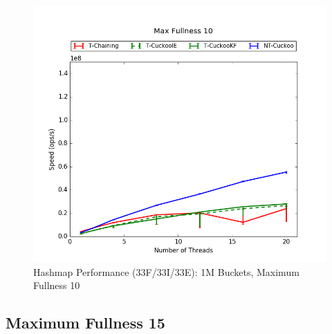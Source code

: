 \begin{figure}[H]
    \centering
	\begin{minipage}{0.5\textwidth}\includegraphics[width=\textwidth]{maps/10HM1M:F34,I33,E33.png} 
    \end{minipage}
	\begin{minipage}{0.4\textwidth}
    
    \end{minipage}
    \caption{Hashmap Performance (33F/33I/33E): 1M Buckets, Maximum Fullness 10}
\end{figure}

\subsection{Maximum Fullness 15}

